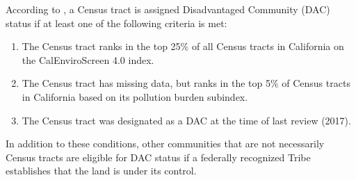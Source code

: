 According to \cite{oehha2022sb}, a Census tract is assigned Disadvantaged Community (DAC) status if at least one of the following criteria is met: 
\begin{enumerate}
    \item The Census tract ranks in the top 25\% of all Census tracts in California on the CalEnviroScreen 4.0 index. 
    \item The Census tract has missing data, but ranks in the top 5\% of Census tracts in California based on its pollution burden subindex.
    \item The Census tract was designated as a DAC at the time of last review (2017).
\end{enumerate}
In addition to these conditions, other communities that are not necessarily Census tracts are eligible for DAC status if a federally recognized Tribe establishes that the land is under its control. 

